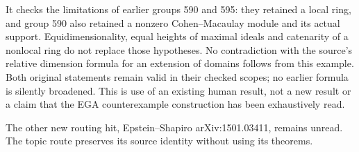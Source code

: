 It checks the limitations of earlier groups 590 and 595: they retained a local ring, and group 590 also retained a nonzero Cohen--Macaulay module and its actual support. Equidimensionality, equal heights of maximal ideals and catenarity of a nonlocal ring do not replace those hypotheses. No contradiction with the source's relative dimension formula for an extension of domains follows from this example. Both original statements remain valid in their checked scopes; no earlier formula is silently broadened. This is use of an existing human result, not a new result or a claim that the EGA counterexample construction has been exhaustively read.

The other new routing hit, Epstein--Shapiro arXiv:1501.03411, remains unread. The topic route preserves its source identity without using its theorems.
